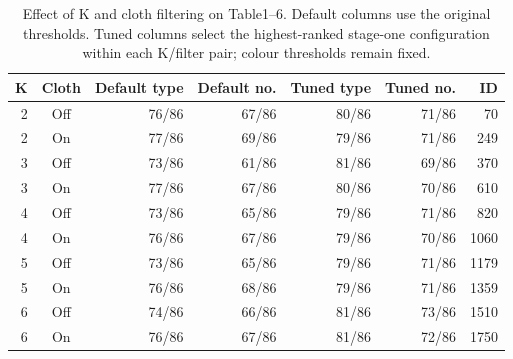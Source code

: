 \begin{table}[htbp]
\centering
\small
\caption{Effect of K and cloth filtering on Table1--6. Default columns use the original thresholds. Tuned columns select the highest-ranked stage-one configuration within each K/filter pair; colour thresholds remain fixed.}
\label{tab:recognition-search-k}
\begin{tabular}{rcrrrrr}
\toprule
K & Cloth & Default type & Default no. & Tuned type & Tuned no. & ID \\
\midrule
2 & Off & 76/86 & 67/86 & 80/86 & 71/86 & 70 \\
2 & On & 77/86 & 69/86 & 79/86 & 71/86 & 249 \\
3 & Off & 73/86 & 61/86 & 81/86 & 69/86 & 370 \\
3 & On & 77/86 & 67/86 & 80/86 & 70/86 & 610 \\
4 & Off & 73/86 & 65/86 & 79/86 & 71/86 & 820 \\
4 & On & 76/86 & 67/86 & 79/86 & 70/86 & 1060 \\
5 & Off & 73/86 & 65/86 & 79/86 & 71/86 & 1179 \\
5 & On & 76/86 & 68/86 & 79/86 & 71/86 & 1359 \\
6 & Off & 74/86 & 66/86 & 81/86 & 73/86 & 1510 \\
6 & On & 76/86 & 67/86 & 81/86 & 72/86 & 1750 \\
\bottomrule
\end{tabular}
\end{table}
\FloatBarrier
